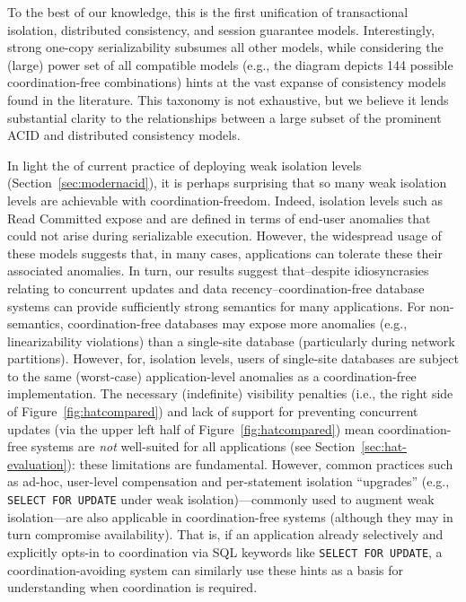 To the best of our knowledge, this is the first unification of
transactional isolation, distributed consistency, and session
guarantee models. Interestingly, strong one-copy serializability
subsumes all other models, while considering the (large) power set of
all compatible models (e.g., the diagram depicts 144 possible
coordination-free combinations) hints at the vast expanse of
consistency models found in the literature. This taxonomy is not
exhaustive, but we believe it lends substantial clarity to the
relationships between a large subset of the prominent ACID and
distributed consistency models.

In light the of current practice of deploying weak isolation levels
(Section~\ref{sec:modernacid}), it is perhaps surprising that so many
weak isolation levels are achievable with
coordination-freedom. Indeed, isolation levels such as Read Committed
expose and are defined in terms of end-user anomalies that could not
arise during serializable execution. However, the widespread usage of
these models suggests that, in many cases, applications can tolerate
these their associated anomalies. In turn, our results suggest
that--despite idiosyncrasies relating to concurrent updates and data
recency--coordination-free database systems can provide sufficiently
strong semantics for many applications. For non-\iconfluent semantics,
coordination-free databases may expose more anomalies (e.g.,
linearizability violations) than a single-site database (particularly
during network partitions). However, for, \iconfluent isolation
levels, users of single-site databases are subject to the same
(worst-case) application-level anomalies as a coordination-free
implementation. The necessary (indefinite) visibility penalties (i.e.,
the right side of Figure~\ref{fig:hatcompared}) and lack of support
for preventing concurrent updates (via the upper left half of
Figure~\ref{fig:hatcompared}) mean coordination-free systems are
\textit{not} well-suited for all applications (see
Section~\ref{sec:hat-evaluation}): these limitations are
fundamental. However, common practices such as ad-hoc, user-level
compensation and per-statement isolation ``upgrades'' (e.g.,
\texttt{SELECT FOR UPDATE} under weak isolation)---commonly used to
augment weak isolation---are also applicable in coordination-free
systems (although they may in turn compromise availability). That is,
if an application already selectively and explicitly opts-in to
coordination via SQL keywords like \texttt{SELECT FOR UPDATE}, a
coordination-avoiding system can similarly use these hints as a basis
for understanding when coordination is required.

